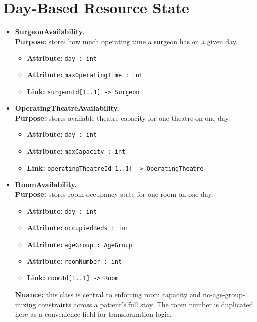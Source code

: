\documentclass[10pt]{article}
\newcommand{\clabel}[1]{{\large\bfseries #1}}
\begin{document}
\section*{Day-Based Resource State}
\begin{itemize}
    \item \clabel{SurgeonAvailability.}\\
    \textbf{Purpose:} stores how much operating time a surgeon has on a given day.
    \begin{itemize}
        \item \textbf{Attribute:} \texttt{day : int}
        \item \textbf{Attribute:} \texttt{maxOperatingTime : int}
        \item \textbf{Link:} \texttt{surgeonId[1..1] -> Surgeon}
    \end{itemize}

    \item \clabel{OperatingTheatreAvailability.}\\
    \textbf{Purpose:} stores available theatre capacity for one theatre on one day.
    \begin{itemize}
        \item \textbf{Attribute:} \texttt{day : int}
        \item \textbf{Attribute:} \texttt{maxCapacity : int}
        \item \textbf{Link:} \texttt{operatingTheatreId[1..1] -> OperatingTheatre}
    \end{itemize}

    \item \clabel{RoomAvailability.}\\
    \textbf{Purpose:} stores room occupancy state for one room on one day.
    \begin{itemize}
        \item \textbf{Attribute:} \texttt{day : int}
        \item \textbf{Attribute:} \texttt{occupiedBeds : int}
        \item \textbf{Attribute:} \texttt{ageGroup : AgeGroup}
        \item \textbf{Attribute:} \texttt{roomNumber : int}
        \item \textbf{Link:} \texttt{roomId[1..1] -> Room}
    \end{itemize}
    \textbf{Nuance:} this class is central to enforcing room capacity and no-age-group-mixing constraints across a patient’s full stay. The room number is duplicated here as a convenience field for transformation logic.
\end{itemize}
\end{document}
